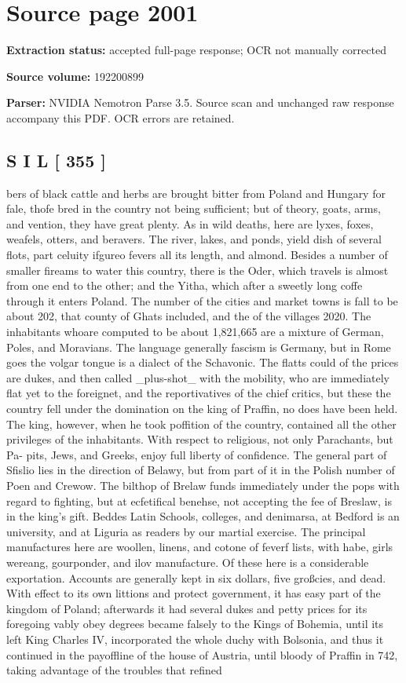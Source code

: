 \clearpage
\section{Source page 2001}
\textbf{Extraction status:} accepted full-page response; OCR not manually corrected\par
\textbf{Source volume:} 192200899\par
\textbf{Parser:} NVIDIA Nemotron Parse 3.5. Source scan and unchanged raw response accompany this PDF. OCR errors are retained.\par\medskip
\subsection*{S I L [ 355 ]}
bers of black cattle and herbs are brought bitter from Poland and Hungary for fale, thofe bred in the country not being sufficient; but of theory, goats, arms, and vention, they have great plenty. As in wild deaths, here are lyxes, foxes, weafels, otters, and beravers. The river, lakes, and ponds, yield dish of several flots, part celuity ifgureo fevers all its length, and almond. Besides a number of smaller fireams to water this country, there is the Oder, which travels is almost from one end to the other; and the Yitha, which after a sweetly long coffe through it enters Poland. The number of the cities and market towns is fall to be about 202, that county of Ghats included, and the of the villages 2020. The inhabitants whoare computed to be about 1,821,665 are a mixture of German, Poles, and Moravians. The language generally fascism is Germany, but in Rome goes the volgar tongue is a dialect of the Schavonic. The flatts could of the prices are dukes, and then called \_plus-shot\_ with the mobility, who are immediately flat yet to the foreignet, and the reportivatives of the chief critics, but these the country fell under the domination on the king of Praffin, no does have been held. The king, however, when he took poffition of the country, contained all the other privileges of the inhabitants. With respect to religious, not only Parachants, but Pa- pits, Jews, and Greeks, enjoy full liberty of confidence. The general part of Sfislio lies in the direction of Belawy, but from part of it in the Polish number of Poen and Crewow. The bilthop of Brelaw funds immediately under the pops with regard to fighting, but at ecfetifical benehse, not accepting the fee of Breslaw, is in the king’s gift. Beddes Latin Schools, colleges, and denimarsa, at Bedford is an university, and at Liguria as readers by our martial exercise. The principal manufactures here are woollen, linens, and cotone of feverf lists, with habe, girls wereang, gourponder, and ilov manufacture. Of these here is a considerable exportation. Accounts are generally kept in six dollars, five großcies, and dead. With effect to its own littions and protect government, it has easy part of the kingdom of Poland; afterwards it had several dukes and petty prices for its foregoing vably obey degrees became falsely to the Kings of Bohemia, until its left King Charles IV, incorporated the whole duchy with Bolsonia, and thus it continued in the payoffline of the house of Austria, until bloody of Praffin in 742, taking advantage of the troubles that refined 